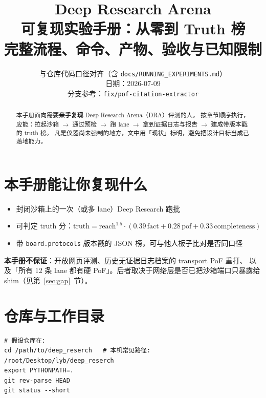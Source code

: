 \documentclass[10.5pt,a4paper]{article}
\title{\textbf{Deep Research Arena}\\[0.35em]
\large 可复现实验手册：从零到 Truth 榜\\[0.25em]
\normalsize 完整流程、命令、产物、验收与已知限制}
\author{与仓库代码口径对齐（含 \texttt{docs/RUNNING\_EXPERIMENTS.md}）\\日期：2026-07-09\\分支参考：\texttt{fix/pof-citation-extractor}}
\date{}
\begin{document}
\maketitle
\begin{abstract}
\noindent
本手册面向需要\textbf{亲手复现} Deep Research Arena（DRA）评测的人。
按章节顺序执行，应能：拉起沙箱 $\rightarrow$ 通过预检 $\rightarrow$ 跑 lane $\rightarrow$
拿到证据日志与报告 $\rightarrow$ 建成带版本戳的 truth 榜。
凡是仪器尚未强制的地方，文中用「现状」标明，避免把设计目标当成已落地能力。
\end{abstract}
\tableofcontents
\newpage

\section{本手册能让你复现什么}

\begin{itemize}
  \item 封闭沙箱上的一次（或多 lane）Deep Research 跑批
  \item 可判定 truth 分：$\mathrm{truth}=\mathrm{reach}^{1.5}\cdot(0.39\,\mathrm{fact}+0.28\,\mathrm{pof}+0.33\,\mathrm{completeness})$
  \item 带 \texttt{board.protocols} 版本戳的 JSON 榜，可与他人板子比对是否同口径
\end{itemize}

\textbf{本手册不保证}：开放网页评测、历史无证据日志档案的 transport PoF 重打、
以及「所有 12 条 lane 都有硬 PoF」。后者取决于网络层是否已把沙箱端口只暴露给 shim（见第~\ref{sec:gap}~节）。

\section{仓库与工作目录}

\begin{lstlisting}
# 假设仓库在:
cd /path/to/deep_reserch   # 本机常见路径: /root/Desktop/lyb/deep_reserch
export PYTHONPATH=.
git rev-parse HEAD
git status --short
\end{lstlisting}
\end{document}
